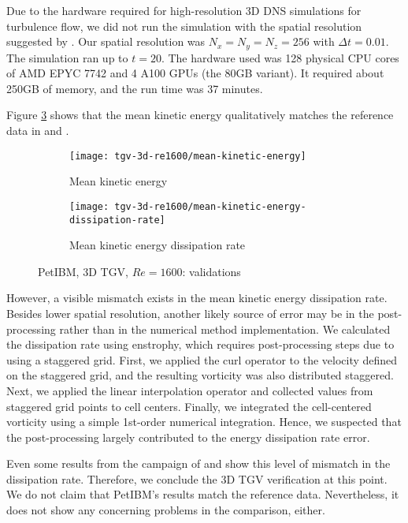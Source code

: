 Due to the hardware required for high-resolution 3D DNS simulations for turbulence flow, we did not run the simulation with the spatial resolution suggested by \cite{noauthor_1st_2012}.
Our spatial resolution was $N_x=N_y=N_z=256$ with $\Delta t=0.01$.
The simulation ran up to $t=20$.
The hardware used was 128 physical CPU cores of AMD EPYC 7742 and 4 A100 GPUs (the 80GB variant).
It required about 250GB of memory, and the run time was 37 minutes.

Figure \ref{fig:petibm-tgv3d-re1600-val} shows that the mean kinetic energy qualitatively matches the reference data in \cite{noauthor_1st_2012} and \cite{debonis_solutions_2013}.
\begin{figure}[hbt!]
    \centering
    \begin{subfigure}[b]{0.45\textwidth}
        \centering
        \texttt{[image: tgv-3d-re1600/mean-kinetic-energy]}
        \caption{Mean kinetic energy}
        \label{fig:petibm-tgv3d-re1600-mean-energy}
    \end{subfigure}
    \hfill
    \begin{subfigure}[b]{0.45\textwidth}
        \centering
        \texttt{[image: tgv-3d-re1600/mean-kinetic-energy-dissipation-rate]}
        \caption{Mean kinetic energy dissipation rate}
        \label{fig:petibm-tgv3d-re1600-mean-energy-dissp}
    \end{subfigure}
    \caption{PetIBM, 3D TGV, $Re=1600$: validations}
    \label{fig:petibm-tgv3d-re1600-val}
\end{figure}
However, a visible mismatch exists in the mean kinetic energy dissipation rate.
Besides lower spatial resolution, another likely source of error may be in the post-processing rather than in the numerical method implementation.
We calculated the dissipation rate using enstrophy, which requires post-processing steps due to using a staggered grid.
First, we applied the curl operator to the velocity defined on the staggered grid, and the resulting vorticity was also distributed staggered.
Next, we applied the linear interpolation operator and collected values from staggered grid points to cell centers.
Finally, we integrated the cell-centered vorticity using a simple 1st-order numerical integration.
Hence, we suspected that the post-processing largely contributed to the energy dissipation rate error.

Even some results from the campaign of \cite{noauthor_1st_2012} and \cite{debonis_solutions_2013} show this level of mismatch in the dissipation rate.
Therefore, we conclude the 3D TGV verification at this point.
We do not claim that PetIBM's results match the reference data.
Nevertheless, it does not show any concerning problems in the comparison, either.

